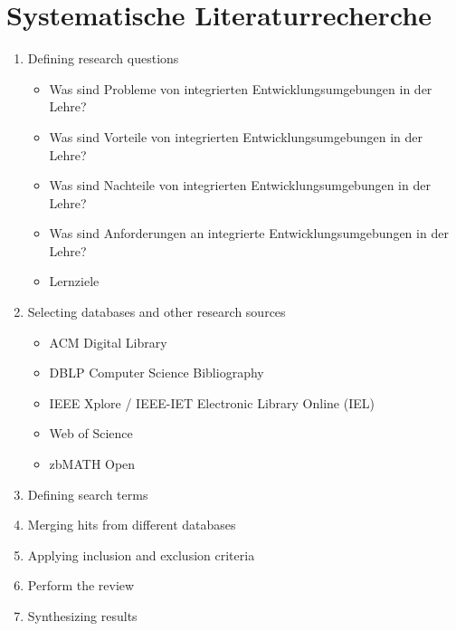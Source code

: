 \chapter{Systematische Literaturrecherche} \label{systematische_literaturrecherche}

\begin{enumerate}
    \item Defining research questions
          \begin{itemize}
              \item Was sind Probleme von integrierten Entwicklungsumgebungen in der Lehre?
              \item Was sind Vorteile von integrierten Entwicklungsumgebungen in der Lehre?
              \item Was sind Nachteile von integrierten Entwicklungsumgebungen in der Lehre?
              \item Was sind Anforderungen an integrierte Entwicklungsumgebungen in der Lehre?
              \item Lernziele
          \end{itemize}
    \item Selecting databases and other research sources
          \begin{itemize}
              \item ACM Digital Library
              \item DBLP Computer Science Bibliography
              \item IEEE Xplore / IEEE-IET Electronic Library Online (IEL)
              \item Web of Science
              \item zbMATH Open
          \end{itemize}
    \item Defining search terms
    \item Merging hits from different databases
    \item Applying inclusion and exclusion criteria
    \item Perform the review
    \item Synthesizing results
\end{enumerate}